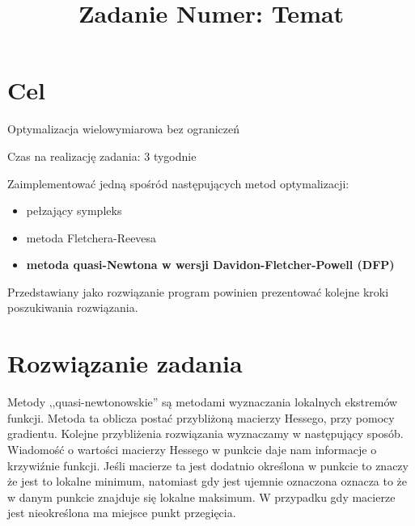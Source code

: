 \documentclass{classrep}
\author{
  \studentinfo{Autor 1}{nr albumu 1} \and
  \studentinfo{Autor 2}{nr albumu 2}
}
\title{Zadanie Numer: Temat} %
\begin{document}
\maketitle



\section{Cel}
Optymalizacja wielowymiarowa bez ograniczeń

Czas na realizację zadania: 3 tygodnie

Zaimplementować jedną spośród następujących metod optymalizacji:
\begin{itemize}
\item    pełzający sympleks
\item    metoda Fletchera-Reevesa
\item  \textbf{ metoda quasi-Newtona w wersji Davidon-Fletcher-Powell (DFP)}
\end{itemize}
Przedstawiany jako rozwiązanie program powinien prezentować kolejne kroki poszukiwania rozwiązania.

\section{Rozwiązanie zadania}

Metody ,,quasi-newtonowskie'' są metodami wyznaczania lokalnych ekstremów funkcji. Metoda ta oblicza postać przybliżoną macierzy Hessego, przy pomocy gradientu. Kolejne przybliżenia rozwiązania wyznaczamy w następujący sposób.\\
Wiadomość o wartości macierzy Hessego w punkcie daje nam informacje o krzywiźnie funkcji. Jeśli macierze ta jest dodatnio określona w punkcie to znaczy że jest to lokalne minimum, natomiast gdy jest ujemnie oznaczona oznacza to że w danym punkcie znajduje się lokalne maksimum. W przypadku gdy macierze jest nieokreślona ma miejsce punkt przegięcia.
\end{document}
